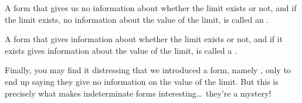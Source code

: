 \documentclass{ximera}
\begin{document}
\begin{definition}
A form that gives us no information about whether the limit exists or not, and if the limit exists, no information about the value of the limit, is
called an .

A form that gives information about whether the limit exists or not, and if it exists gives information about the value of the limit, is called a
.
\end{definition}  

Finally, you may find it distressing that we introduced a form, namely
\zeroOverZero, only to end up saying they give no information on the
value of the limit. But this is precisely what makes
indeterminate forms interesting\dots~they're a mystery!
\end{document}
